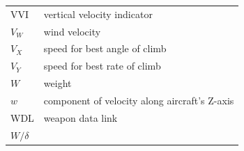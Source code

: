 \documentclass[
]{book}
\begin{document}
\begin{longtable}[]{@{}ll@{}}
\begin{minipage}[t]{0.47\columnwidth}
VVI\strut
\end{minipage} & \begin{minipage}[t]{0.47\columnwidth}\raggedright
vertical velocity indicator\strut
\end{minipage}\tabularnewline
\begin{minipage}[t]{0.47\columnwidth}\raggedright
\(V_W\)\strut
\end{minipage} & \begin{minipage}[t]{0.47\columnwidth}\raggedright
wind velocity\strut
\end{minipage}\tabularnewline
\begin{minipage}[t]{0.47\columnwidth}\raggedright
\(V_X\)\strut
\end{minipage} & \begin{minipage}[t]{0.47\columnwidth}\raggedright
speed for best angle of climb\strut
\end{minipage}\tabularnewline
\begin{minipage}[t]{0.47\columnwidth}\raggedright
\(V_Y\)\strut
\end{minipage} & \begin{minipage}[t]{0.47\columnwidth}\raggedright
speed for best rate of climb\strut
\end{minipage}\tabularnewline
\begin{minipage}[t]{0.47\columnwidth}\raggedright
\(W\)\strut
\end{minipage} & \begin{minipage}[t]{0.47\columnwidth}\raggedright
weight\strut
\end{minipage}\tabularnewline
\begin{minipage}[t]{0.47\columnwidth}\raggedright
\(w\)\strut
\end{minipage} & \begin{minipage}[t]{0.47\columnwidth}\raggedright
component of velocity along aircraft's Z-axis\strut
\end{minipage}\tabularnewline
\begin{minipage}[t]{0.47\columnwidth}\raggedright
WDL\strut
\end{minipage} & \begin{minipage}[t]{0.47\columnwidth}\raggedright
weapon data link\strut
\end{minipage}\tabularnewline
\begin{minipage}[t]{0.47\columnwidth}\raggedright
\(W / \delta\)\strut
\end{minipage} & \begin{minipage}[t]{0.47\columnwidth}\raggedright

\end{minipage}
\end{longtable}
\end{document}
